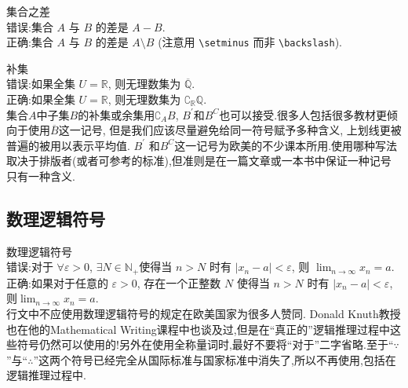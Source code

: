 \documentclass[a4paper]{article}
\begin{document}
\begin{compactitem}[\hspace{1.02em}$\bullet$]
	\item 集合之差\\
	\textsf{错误}:集合 $A$ 与 $B$ 的差是 $A-B$.\\
	\textsf{正确}:集合 $A$ 与 $B$ 的差是 $A \setminus B$ (注意用 \verb|\setminus| 而非 \verb|\backslash|).
	\item 补集\\
	\textsf{错误}:如果全集 $U=\mathbb{R}$, 则无理数集为 $\overline{\mathbb{Q}}$.\\
    \textsf{正确}:如果全集 $U=\mathbb{R}$, 则无理数集为 $\complement_{\mathbb{R}} \mathbb{Q}$.\\
	集合$A$中子集$B$的补集或余集用$\complement_{A} B$, $B^{\prime}$和$B^{C}$也可以接受.很多人包括很多教材更倾向于使用$\overline{B}$这一记号, 但是我们应该尽量避免给同一符号赋予多种含义, 上划线更被普遍的被用以表示平均值. $B^{\prime}$ 和$B^{C}$这一记号为欧美的不少课本所用.使用哪种写法取决于排版者(或者可参考的标准),但准则是在一篇文章或一本书中保证一种记号只有一种含义.\eop
\end{compactitem}

\subsection{数理逻辑符号}
\begin{compactitem}[\hspace{1.02em}$\bullet$]
	\item 数理逻辑符号\\
	\textsf{错误}:对于 $\forall \varepsilon>0$, $\exists N \in \mathbb{N}_{+}$使得当 $n>N$ 时有 $\left|x_{n}-a\right|<\varepsilon$, 则 $\lim _{n \rightarrow \infty} x_{n}=a$.\\
	\textsf{正确}:如果对于任意的 $\varepsilon>0$, 存在一个正整数 $N$ 使得当 $n>N$ 时有 $\left|x_{n}-a\right|<\varepsilon$, 则$\lim _{n \rightarrow \infty} x_{n}=a$.\\
	行文中不应使用数理逻辑符号的规定在欧美国家为很多人赞同. Donald Knuth教授也在他的Mathematical Writing课程中也谈及过,但是在``真正的''逻辑推理过程中这些符号仍然可以使用的!另外在使用全称量词时,最好不要将``对于''二字省略.至于``$\because$''与``$\therefore$''这两个符号已经完全从国际标准与国家标准中消失了,所以不再使用,包括在逻辑推理过程中.\eop
\end{compactitem}
\end{document}
